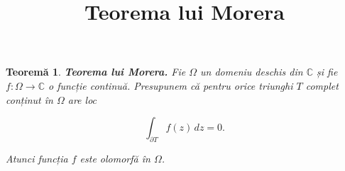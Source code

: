 \documentclass[12pt]{article}
\title{Teorema lui Morera}
\author{}
\date{}
\theoremstyle{plain}
\newtheorem{theorem}{Teoremă}
\begin{document}
\maketitle

\begin{theorem}
\textbf{Teorema lui Morera.}  
Fie $\Omega$ un domeniu deschis din $\mathbb{C}$ și fie $f : \Omega \to \mathbb{C}$ o funcție continuă.  
Presupunem că pentru orice triunghi $T$ complet conținut în $\Omega$ are loc



\[
\int_{\partial T} f(z)\, dz = 0.
\]



Atunci funcția $f$ este olomorfă în $\Omega$.
\end{theorem}
\end{document}
